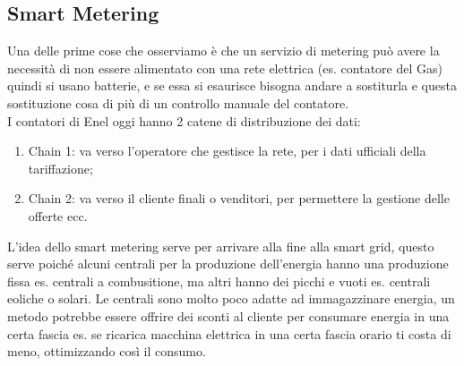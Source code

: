 \documentclass[11pt, twocolumn]{article}
\newenvironment{myenumerate}
{ \begin{enumerate}[topsep=0ex]
		\setlength{\itemsep}{0pt}
		\setlength{\parskip}{0pt}
		\setlength{\parsep}{0pt}     }
	{ \end{enumerate}                  }
\begin{document}
\subsection{Smart Metering}
Una delle prime cose che osserviamo è che un servizio di metering può avere la necessità di non essere alimentato con una rete elettrica (es. contatore del Gas) quindi si usano batterie, e se essa si esaurisce bisogna andare a sostiturla e questa sostituzione cosa di più di un controllo manuale del contatore.\\
I contatori di Enel oggi hanno 2 catene di distribuzione dei dati:
\begin{myenumerate}
  \item Chain 1: va verso l'operatore che gestisce la rete, per i dati ufficiali della tariffazione;
  \item Chain 2: va verso il cliente finali o venditori, per permettere la gestione delle offerte ecc. 
\end{myenumerate}
L'idea dello smart metering serve per arrivare alla fine alla smart grid, questo serve poiché alcuni centrali per la produzione dell'energia hanno una produzione fissa es. centrali a combusitione, ma altri hanno dei picchi e vuoti es. centrali eoliche o solari.
Le centrali sono molto poco adatte ad immagazzinare energia, un metodo potrebbe essere offrire dei sconti al cliente per consumare energia in una certa fascia es. se ricarica macchina elettrica in una certa fascia orario ti costa di meno, ottimizzando così il consumo.
\end{document}
